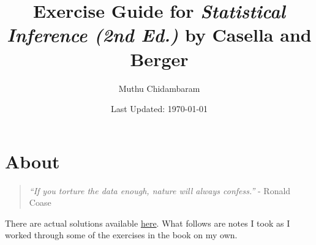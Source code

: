 \documentclass{article}
\begin{document}
\title{Exercise Guide for \textit{Statistical Inference (2nd Ed.)} by Casella and Berger}
\author{Muthu Chidambaram}
\date{Last Updated: \today}

\maketitle

\tableofcontents
\newpage 

\section*{About}

\begin{quote}
        \textit{``If you torture the data enough, nature will always confess.''} - Ronald Coase
\end{quote}

There are actual solutions available
\href{http://exampleproblems.com/Solutions-Casella-Berger.pdf}{here}. What follows are notes I took as
I worked through some of the exercises in the book on my own. 




\end{document}

